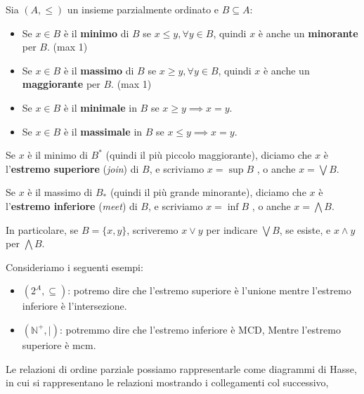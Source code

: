 \begin{definizione}
    Sia $(A,\leq)$ un insieme parzialmente ordinato e $B \subseteq A$:
    \begin{itemize}
        \item Se $x \in B$ è il \textbf{minimo} di $B$ se $x \leq y, \forall y
                  \in B$, quindi $x$ è anche un \textbf{minorante} per $B$. (max 1)
        \item Se $x \in B$ è il \textbf{massimo} di $B$ se $x \geq y,\forall y
                  \in B$, quindi $x$ è anche un \textbf{maggiorante} per $B$. (max 1)
        \item Se $x \in B$ è il \textbf{minimale} in $B$ se $x \geq y \implies
                  x = y$.
        \item Se $x \in B$ è il \textbf{massimale} in $B$ se $x \leq y \implies
                  x = y$.
    \end{itemize}
\end{definizione}
\begin{definizione}
    Se $x$ è il minimo di $B^\ast$ (quindi il più piccolo maggiorante), diciamo
    che $x$ è l'\textbf{estremo superiore} (\textit{join}) di $B$, e scriviamo
    $x = \sup B$ , o anche $x = \bigvee B$.

    Se $x$ è il massimo di $B_\ast$ (quindi il più grande minorante), diciamo che
    $x$ è l'\textbf{estremo inferiore} (\textit{meet}) di $B$, e scriviamo $x =
        \inf B$ , o anche $x = \bigwedge B$.

    In particolare, se $B = \{x, y\}$, scriveremo $x \lor y$ per indicare $\bigvee
        B$, se esiste, e $x \land y$ per $\bigwedge B$.
\end{definizione}
\begin{esempio}
    Consideriamo i seguenti esempi:
    \begin{itemize}
        \item $(2^A, \subseteq)$: potremo dire che l'estremo superiore è l'unione
              mentre l'estremo inferiore è l'intersezione.
        \item $(\mathbb{N}^+,|)$: potremmo dire che l'estremo inferiore è MCD, Mentre
              l'estremo superiore è mcm.
    \end{itemize}
\end{esempio}
Le relazioni di ordine parziale possiamo rappresentarle come diagrammi di Hasse,
in cui si rappresentano le relazioni mostrando i collegamenti col successivo,
